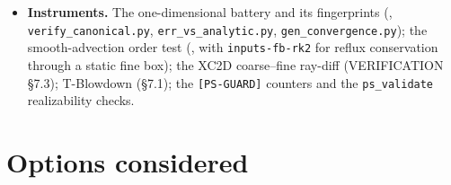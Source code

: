\documentclass[11pt,a4paper]{article}
\newcommand{\code}[1]{\texttt{\small #1}}
\begin{document}
\begin{itemize}[nosep]
      \code{quartic\_interp} (\code{CellConservativeQuartic}) and
      \code{cell\_quartic\_interp}.  The quartic interpolaters carry no
      limiter; they are built for smooth data.  Stage~0 confirms this by
      reading the source.
\item \textbf{Instruments.}  The one-dimensional battery and its
      fingerprints (,
      \code{verify\_canonical.py}, \code{err\_vs\_analytic.py},
      \code{gen\_convergence.py}); the smooth-advection order test
      (, with \code{inputs-fb-rk2} for reflux
      conservation through a static fine box); the XC2D coarse--fine
      ray-diff (VERIFICATION \S7.3); T-Blowdown (\S7.1); the
      \code{[PS-GUARD]} counters and the \code{ps\_validate} realizability
      checks.
\end{itemize}

\section{Options considered}
\label{sec:options}
\end{document}
